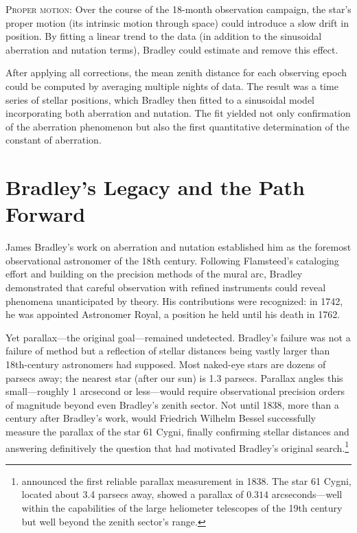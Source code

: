 \textsc{Proper motion:} Over the course of the 18-month observation campaign, the star's proper motion (its intrinsic motion through space) could introduce a slow drift in position. By fitting a linear trend to the data (in addition to the sinusoidal aberration and nutation terms), Bradley could estimate and remove this effect.

After applying all corrections, the mean zenith distance for each observing epoch could be computed by averaging multiple nights of data. The result was a time series of stellar positions, which Bradley then fitted to a sinusoidal model incorporating both aberration and nutation. The fit yielded not only confirmation of the aberration phenomenon but also the first quantitative determination of the constant of aberration.

\section{Bradley's Legacy and the Path Forward}

James Bradley's work on aberration and nutation established him as the foremost observational astronomer of the 18th century. Following Flamsteed's cataloging effort and building on the precision methods of the mural arc, Bradley demonstrated that careful observation with refined instruments could reveal phenomena unanticipated by theory. His contributions were recognized: in 1742, he was appointed Astronomer Royal, a position he held until his death in 1762.

Yet parallax—the original goal—remained undetected. Bradley's failure was not a failure of method but a reflection of stellar distances being vastly larger than 18th-century astronomers had supposed. Most naked-eye stars are dozens of parsecs away; the nearest star (after our sun) is 1.3 parsecs. Parallax angles this small—roughly 1 arcsecond or less—would require observational precision orders of magnitude beyond even Bradley's zenith sector. Not until 1838, more than a century after Bradley's work, would Friedrich Wilhelm Bessel successfully measure the parallax of the star 61 Cygni, finally confirming stellar distances and answering definitively the question that had motivated Bradley's original search.\footnote{\textcite{Bessel1838} announced the first reliable parallax measurement in 1838. The star 61 Cygni, located about 3.4 parsecs away, showed a parallax of $0.314$ arcseconds—well within the capabilities of the large heliometer telescopes of the 19th century but well beyond the zenith sector's range.}

